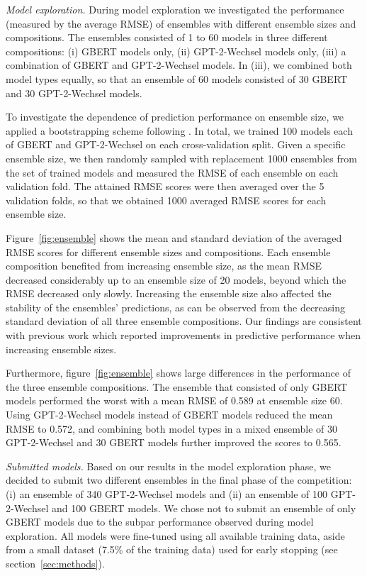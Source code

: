 \documentclass[11pt,a4paper]{article}
\begin{document}
\emph{Model exploration.}
During model exploration we investigated the performance (measured by the average RMSE) of ensembles with different ensemble sizes and compositions.
The ensembles consisted of 1 to 60 models in three different compositions: (i) GBERT models only, (ii) GPT-2-Wechsel models only, (iii) a combination of GBERT and \mbox{GPT-2-Wechsel} models.
In (iii), we combined both model types equally, so that an ensemble of 60 models consisted of 30 GBERT and 30 GPT-2-Wechsel models.

To investigate the dependence of prediction performance on ensemble size, we applied a bootstrapping scheme following \cite{Risch2020,Bornheim2021}.
In total, we trained 100 models each of GBERT and GPT-2-Wechsel on each cross-validation split.
Given a specific ensemble size, we then randomly sampled with replacement 1000 ensembles from the set of trained models and measured the RMSE of each ensemble on each validation fold.
The attained RMSE scores were then averaged over the 5 validation folds, so that we obtained 1000 averaged RMSE scores for each ensemble size.

Figure~\ref{fig:ensemble} shows the mean and standard deviation of the averaged RMSE scores for different ensemble sizes and compositions.
Each ensemble composition benefited from increasing ensemble size, as the mean RMSE decreased considerably up to an ensemble size of 20 models, beyond which the RMSE decreased only slowly.
Increasing the ensemble size also affected the stability of the ensembles' predictions, as can be observed from the decreasing standard deviation of all three ensemble compositions.
Our findings are consistent with previous work \cite{Risch2020,Bornheim2021} which reported improvements in predictive performance when increasing ensemble sizes.

Furthermore, figure~\ref{fig:ensemble} shows large differences in the performance of the three ensemble compositions.
The ensemble that consisted of only GBERT models performed the worst with a mean RMSE of 0.589 at ensemble size 60.
Using \mbox{GPT-2-Wechsel} models instead of GBERT models reduced the mean RMSE to 0.572, and combining both model types in a mixed ensemble of 30 GPT-2-Wechsel and 30 GBERT models further improved the scores to 0.565.

\emph{Submitted models.}
Based on our results in the model exploration phase, we decided to submit two different ensembles in the final phase of the competition: (i) an ensemble of 340 GPT-2-Wechsel models and (ii) an ensemble of 100 GPT-2-Wechsel and 100 GBERT models.
We chose not to submit an ensemble of only GBERT models due to the subpar performance observed during model exploration.
All models were fine-tuned using all available training data, aside from a small dataset (7.5\% of the training data) used for early stopping (see section~\ref{sec:methods}).
\end{document}
